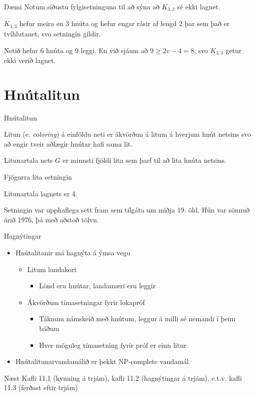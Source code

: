 \documentclass[handout]{beamer}
\begin{document}
\begin{frame}{Dæmi}
Notum síðustu fylgisetninguna til að sýna að $K_{3,3}$ sé ekki lagnet. \pause

\vspace{1cm}
$K_{3,3}$ hefur meira en 3 hnúta og hefur engar rásir af lengd $2$ þar sem það er tvíhlutanet, svo setningin gildir.

Netið hefur 6 hnúta og 9 leggi. En við sjáum að $9 \geq 2v - 4 = 8$, svo $K_{3, 3}$ getur ekki verið lagnet.
\end{frame}

\section{Hnútalitun}

\begin{frame}{Hnútalitun}
\begin{tcolorbox}[title=Litun]
Litun (e. \emph{coloring}) á einföldu neti er ákvörðun á litum á hverjum hnút netsins svo að engir tveir aðlægir hnútar hafi sama lit.
\end{tcolorbox}

\begin{tcolorbox}[title=Litunartala]
Litunartala nets $G$ er minnsti fjöldi lita sem þarf til að lita hnúta netsins. 
\end{tcolorbox}

\end{frame}

\begin{frame}{Fjögurra lita setningin}
\begin{tcolorbox}[title=Fjögurra lita setningin]
Litunartala lagnets er 4.
\end{tcolorbox}
Setningin var upphaflega sett fram sem tilgáta um miðja 19. öld. Hún var sönnuð árið 1976, þá með aðstoð tölvu.
\end{frame}

\begin{frame}{Hagnýtingar}
\begin{itemize}
 \item Hnútalitanir má hagnýta á ýmsa vegu
 \begin{itemize}
  \item Litum landakort
  \begin{itemize}
   \item Lönd eru hnútar, landamæri eru leggir
  \end{itemize}
  \item Ákvörðum tímasetningar fyrir lokapróf
  \begin{itemize}
   \item Táknum námskeið með hnútum, leggur á milli sé nemandi í þeim báðum
   \item Hver möguleg tímasetning fyrir próf er einn litur
  \end{itemize}
 \end{itemize}
 \item Hnútalitunarvandamálið er þekkt NP-complete vandamál
\end{itemize}

\end{frame}


\begin{frame}{Næst}
Kafli 11.1 (kynning á trjám), kafli 11.2 (hagnýtingar á trjám), e.t.v. kafli 11.3 (ferðast eftir trjám)
\end{frame}
\end{document}
